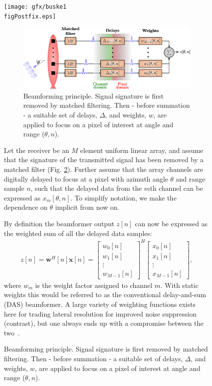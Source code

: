 \documentclass[12pt,journal,draftclsnofoot,onecolumn]{IEEEtran}
\let\MYoriglatexcaption\caption               %
\renewcommand{\caption}[2][\relax]{\MYoriglatexcaption[#2]{#2}}
\newcommand\bmat[1]{\begin{bmatrix}#1\end{bmatrix}}
\renewcommand\H{^{\scriptscriptstyle H}}
\renewcommand\vec[1]{\boldsymbol{#1}}
\newcommand\1{\vec 1}
\newcommand*\w{\vec w}
\newcommand*\x{\vec x}
\begin{document}
\ifPeerReview
\begin{figure}[H]\centering
\texttt{[image: gfx/buske1\\figPostfix.eps]}
\else
\begin{figure}[!t]\centering
\includegraphics[width=\linewidth]{gfx/beamforming.eps}
\fi%
\caption{Beamforming principle. Signal signature is first removed by matched filtering. Then - before summation - a suitable set of delays, $\Delta$, and weights, $w$, are applied to focus on a pixel of interest at angle and range ($\theta,n$).}\label{beamforming}
\end{figure}
Let the receiver be an $M$ element uniform linear array, and assume that the signature of the transmitted signal has been removed by a matched filter (Fig. \ref{beamforming}). Further assume that the array channels are digitally delayed to focus at a pixel with azimuth angle $\theta$ and range sample $n$, such that the delayed data from the $m$th channel can be expressed as $x_m[\theta,n]$. To simplify notation, we make the dependence on $\theta$ implicit from now on. 

By definition the beamformer output $z[n]$ can now be expressed as the weighted sum of all the delayed data samples:
\begin{align}
z[n] = \w\H[n]\x[n] = \bmat{w_0[n]\\w_1[n]\\\vdots\\w_{M-1}[n]}^H \bmat{x_0[n]\\x_1[n]\\\vdots\\x_{M-1}[n]},\label{z}
\end{align}
where $w_m$ is the weight factor assigned to channel $m$. With static weights this would be referred to as the conventional delay-and-sum (DAS) beamformer. A large variety of weighting functions exists here for trading lateral resolution for improved noise suppression (contrast), but one always ends up with a compromise between the two~\cite{Harris1978}.


\end{figure}
\end{document}
